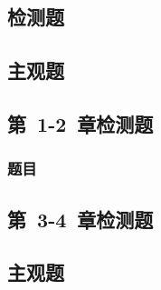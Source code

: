 \documentclass[color=orange,openany]{textbook-cn}
\begin{document}
\begin{Quiz}
\chapter{检测题}


\section{主观题}
\end{Quiz}






\begin{Test}
\chapter{第~1-2~章检测题}
\lipsum\lipsum\cite{7}\cite{6}
\subsection{题目}
\end{Test}

\begin{Quiz}
\chapter{第~3-4~章检测题}
\section{主观题}
\end{Quiz}



\tcbstoprecording
\end{document}
